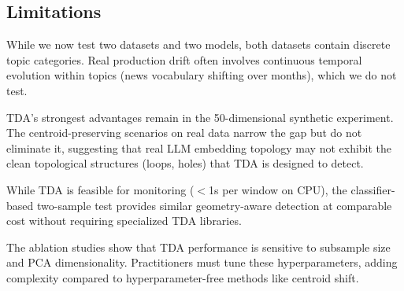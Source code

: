\subsection{Limitations}
\label{sec:limitations}

While we now test two datasets and two models, both datasets contain discrete topic categories. Real production drift often involves continuous temporal evolution within topics (\eg news vocabulary shifting over months), which we do not test.

TDA's strongest advantages remain in the 50-dimensional synthetic experiment. The centroid-preserving scenarios on real data narrow the gap but do not eliminate it, suggesting that real LLM embedding topology may not exhibit the clean topological structures (loops, holes) that TDA is designed to detect.

While TDA is feasible for monitoring ($<$1s per window on CPU), the classifier-based two-sample test provides similar geometry-aware detection at comparable cost without requiring specialized TDA libraries.

The ablation studies show that TDA performance is sensitive to subsample size and PCA dimensionality. Practitioners must tune these hyperparameters, adding complexity compared to hyperparameter-free methods like centroid shift.
